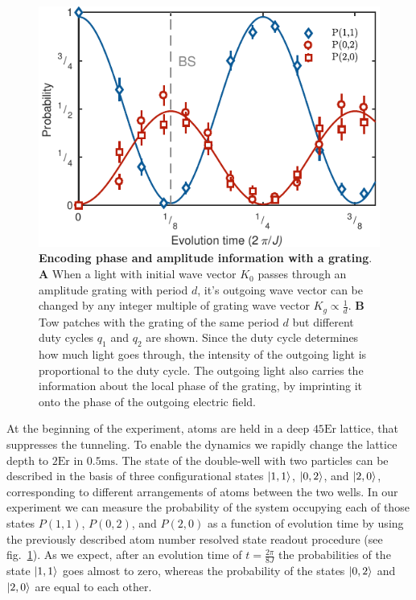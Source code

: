 \begin{figure}[t]
	\centering
	\includegraphics[scale=1]{figures/CBH_HOM.pdf}
	\caption{{\bf Encoding phase and amplitude information with a grating}. {\bf A} When a light with initial wave vector $K_0$ passes through an amplitude grating with period $d$, it's outgoing wave vector can be changed by any integer multiple of grating wave vector $K_g\propto \frac{1}{d}$. {\bf B} Tow patches with the grating of the same period $d$ but different duty cycles $q_1$ and $q_2$ are shown. Since the duty cycle determines how much light goes through, the intensity of the outgoing light is proportional to the duty cycle. The outgoing light also carries the information about the local phase of the grating, by imprinting it onto the phase of the outgoing electric field.}
	\label{fig:CBH_HOM}
\end{figure}

At the beginning of the experiment, atoms are held in a deep $45 \textrm{Er}$ lattice, that suppresses the tunneling. To enable the dynamics we rapidly change the lattice depth to $2\textrm{Er}$ in $0.5\textrm{ms}$. The state of the double-well with two particles can be described in the basis of three configurational states $\left|1,1\right\rangle$, $\left|0,2\right\rangle$, and $\left|2,0\right\rangle$, corresponding to different arrangements of atoms between the two wells. In our experiment we can measure the probability of the system occupying each of those states $P(1,1)$, $P(0,2)$, and $P(2,0)$ as a function of evolution time by using the previously described atom number resolved state readout procedure (see fig.~\ref{fig:CBH_HOM}). As we expect, after an evolution time of $t= \frac{2 \pi}{8J}$ the probabilities of the state $\left|1,1\right\rangle$ goes almost to zero, whereas the probability of the states $\left|0,2\right\rangle$ and $\left|2,0\right\rangle$ are equal to each other. 

